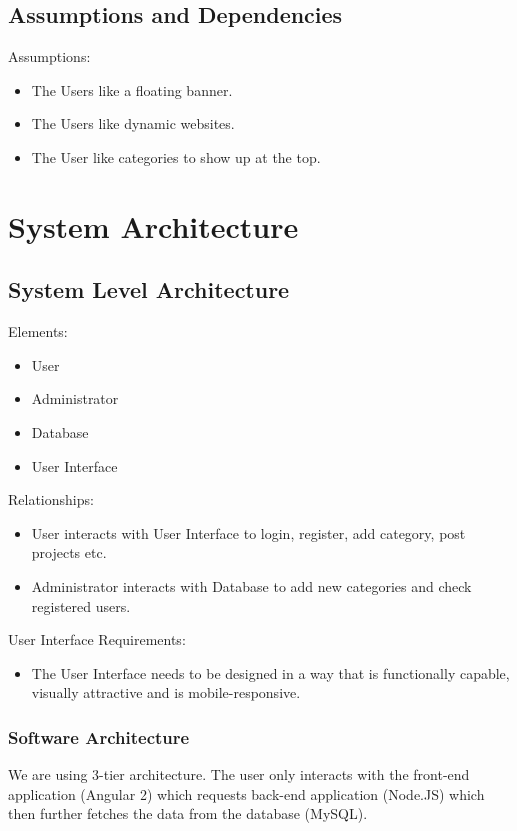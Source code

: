 \documentclass{scrreprt}
\begin{document}
\section{Assumptions and Dependencies}
Assumptions:
\begin{itemize}
  \item The Users like a floating banner.
  \item The Users like dynamic websites.
  \item The User like categories to show up at the top.
\end{itemize}

\chapter{System Architecture}

\section{System Level Architecture}
Elements:
\begin{itemize}
  \item User
  \item Administrator
  \item Database
  \item User Interface
\end{itemize}

Relationships:
\begin{itemize}
    \item User interacts with User Interface to login, register, add category, post projects etc.
    \item Administrator interacts with Database to add new categories and check registered users.
\end{itemize}

User Interface Requirements:
\begin{itemize}
    \item The User Interface needs to be designed in a way that is functionally capable, visually attractive and is mobile-responsive.
\end{itemize}
\newpage

\subsection{Software Architecture}
We are using 3-tier architecture. The user only interacts with the front-end application (Angular 2) which requests back-end application (Node.JS) which then further fetches the data from the database (MySQL).
\end{document}
